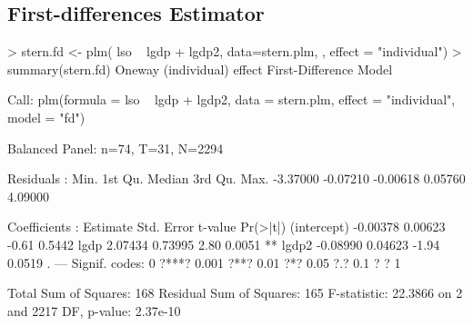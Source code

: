 \documentclass[landscape,letterpaper,9pt]{article}
\begin{document}
\subsection{First-differences Estimator}
\begin{CVerbatim}
> stern.fd <- plm( lso ~ lgdp  + lgdp2, 
      data=stern.plm,  \fbox{\textcolor{red}{model = "fd"}}, effect = "individual")
> summary(stern.fd)
Oneway (individual) effect First-Difference Model

Call:
plm(formula = lso ~ lgdp + lgdp2, data = stern.plm, effect = "individual",
    model = "fd")

Balanced Panel: n=74, T=31, N=2294

Residuals :
    Min.  1st Qu.   Median  3rd Qu.     Max.
-3.37000 -0.07210 -0.00618  0.05760  4.09000

Coefficients :
            Estimate Std. Error t-value Pr(>|t|)
(intercept) -0.00378    0.00623   -0.61   0.5442
lgdp         2.07434    0.73995    2.80   0.0051 **
lgdp2       -0.08990    0.04623   -1.94   0.0519 .
---
Signif. codes:  0 ?***? 0.001 ?**? 0.01 ?*? 0.05 ?.? 0.1 ? ? 1

Total Sum of Squares:    168
Residual Sum of Squares: 165
F-statistic: 22.3866 on 2 and 2217 DF, p-value: 2.37e-10
\end{CVerbatim}
%
\newpage
\end{document}
